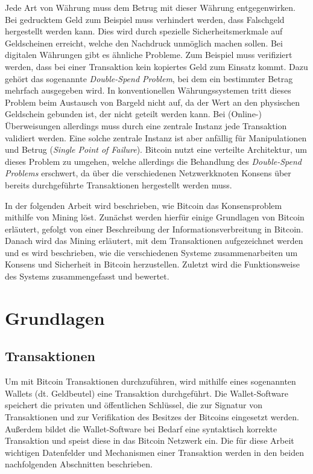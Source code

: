 \documentclass[ngerman,runningheads,a4paper]{llncs}[2018/03/10]
\begin{document}
Jede Art von Währung muss dem Betrug mit dieser Währung entgegenwirken. Bei gedrucktem Geld zum Beispiel muss verhindert werden, dass Falschgeld hergestellt werden kann. Dies wird durch spezielle Sicherheitsmerkmale auf Geldscheinen erreicht, welche den Nachdruck unmöglich machen sollen. Bei digitalen Währungen gibt es ähnliche Probleme. Zum Beispiel muss verifiziert werden, dass bei einer Transaktion kein kopiertes Geld zum Einsatz kommt. Dazu gehört das sogenannte \textit{Double-Spend Problem}, bei dem ein bestimmter Betrag mehrfach ausgegeben wird. In konventionellen Währungssystemen tritt dieses Problem beim Austausch von Bargeld nicht auf, da der Wert an den physischen Geldschein gebunden ist, der nicht geteilt werden kann. Bei (Online-) Überweisungen allerdings muss durch eine zentrale Instanz jede Transaktion validiert werden. Eine solche zentrale Instanz ist aber anfällig für Manipulationen und Betrug (\textit{Single Point of Failure}). Bitcoin nutzt eine verteilte Architektur, um dieses Problem zu umgehen, welche allerdings die Behandlung des \textit{Double-Spend Problems} erschwert, da über die verschiedenen Netzwerkknoten Konsens über bereits durchgeführte Transaktionen hergestellt werden muss. 

In der folgenden Arbeit wird beschrieben, wie Bitcoin das Konsensproblem mithilfe von Mining löst. Zunächst werden hierfür einige Grundlagen von Bitcoin erläutert, gefolgt von einer Beschreibung der Informationsverbreitung in Bitcoin. Danach wird das Mining erläutert, mit dem Transaktionen aufgezeichnet werden und es wird beschrieben, wie die verschiedenen Systeme zusammenarbeiten um Konsens und Sicherheit in Bitcoin herzustellen. Zuletzt wird die Funktionsweise des Systems zusammengefasst und bewertet.

\section{Grundlagen}\label{sec:grundlagen}

\subsection{Transaktionen}\label{sec:transaktionen}

Um mit Bitcoin Transaktionen durchzuführen, wird mithilfe eines sogenannten Wallets (dt. Geldbeutel) eine Transaktion durchgeführt. Die Wallet-Software speichert die privaten und öffentlichen Schlüssel, die zur Signatur von Transaktionen und zur Verifikation des Besitzes der Bitcoins eingesetzt werden. Außerdem bildet die Wallet-Software bei Bedarf eine syntaktisch korrekte Transaktion und speist diese in das Bitcoin Netzwerk ein. Die für diese Arbeit wichtigen Datenfelder und Mechanismen einer Transaktion werden in den beiden nachfolgenden Abschnitten beschrieben.
\end{document}
